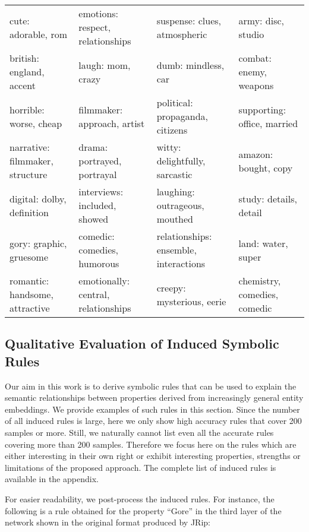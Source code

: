 \begin{sidewaystable}
\begin{adjustbox}{center}
\begin{tabular}{|ll|ll|}
			cute: adorable, rom & emotions: respect, relationships & suspense: clues, atmospheric & army: disc, studio\\
			british: england, accent & laugh: mom, crazy & dumb: mindless, car & combat: enemy, weapons  \\
			horrible: worse, cheap & filmmaker: approach, artist & political: propaganda, citizens & supporting: office, married \\
			narrative: filmmaker, structure & drama: portrayed, portrayal & witty: delightfully, sarcastic & amazon: bought, copy \\
			digital: dolby, definition & interviews: included, showed & laughing: outrageous, mouthed & study: details, detail \\
			gory: graphic, gruesome & comedic: comedies, humorous & relationships: ensemble, interactions & land: water, super \\
			romantic: handsome, attractive & emotionally: central, relationships & creepy: mysterious, eerie & chemistry, comedies, comedic \\
			
			\hline 
		\end{tabular}
	\end{adjustbox}
\end{sidewaystable}

\subsection{Qualitative Evaluation of Induced Symbolic Rules}

Our aim in this work is to derive symbolic rules that can be used to explain the semantic relationships between properties derived from increasingly general entity embeddings. We provide examples of such rules in this section. Since the number of all induced rules is large, here we only show high accuracy rules that cover 200 samples or more.  Still, we naturally cannot list even all the accurate rules covering more than 200 samples. Therefore we focus here on the rules which are either interesting in their own right or exhibit interesting properties, strengths or limitations of the proposed approach. The complete list of induced rules is available in the appendix.

For easier readability, we post-process the induced rules. For instance, the following is a rule obtained for the property ``Gore'' in the third layer of the network shown in the original format produced by JRip:


